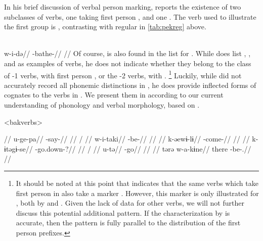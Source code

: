 In his brief discussion of \bakairi verbal person marking, \textcite{meira2003bakairi} reports the existence of two subclasses of  verbs, one taking first person , and one .
The verb used to illustrate the first group is   , contrasting with regular   in \cref{tab:pekreg} above.

\bakairi \parencite[][4]{meira2003bakairi}\\
\begingl
\gla w-i-də//
\glb {}-bathe-//
\glft {}//
\endgl
\xe
%
Of course,  is also found in the list for \arara.
While \textcite[4]{meira2003bakairi} does list  ,  , and   as examples of  verbs, he does not indicate whether they belong to the class of -1 verbs, with first person , or the -2 verbs, with .%
\footnote{
It should be noted at this point that \textcite{meira2003bakairi} indicates that the same verbs which take first person  in \bakairi also take a  marker .
However, this marker is only illustrated for , both by \textcite{meira2003bakairi} and \textcite{von1892bakairi}.
Given the lack of data for other verbs, we will not further discuss this potential additional pattern.
If the characterization by \citeauthor{meira2003bakairi} is accurate, then the pattern is fully parallel to the distribution of the first person prefixes.
}
Luckily, while \textcite{von1892bakairi} did not accurately record all phonemic distinctions in \bakairi \parencite{meira2005bakairi}, he does provide inflected forms of cognates to the \arara verbs in .
We present them in  according to our current understanding of \bakairi phonology and verbal morphology, based on \textcites{wheatley1969bakairi}{meira2003bakairi}{meira2005bakairi}{franchetto2016classes}.

\pex[everyglpreamble=]<bakverbs> \bakairi \parencite[][131, 397, 76, 137, 374, 130]{von1892bakairi}
\begin{multicols}{2}
\begingl
\glpreamble {} //
\gla u-ge-pa//
\glb {}-say-//
\glft {}//
\endgl
{}
\begingl
\glpreamble {} /  //
\gla w-i-taki//
\glb {}-be-//
\glft {}//
\endgl
{}
\begingl
\glpreamble {} //
\gla k-əewɨ-lɨ//
\glb {}-come-//
\glft {}//
\endgl
{}
\begingl
\glpreamble {} //
\gla k-ɨtəgɨ-se//
\glb {}-go.down-?//
\glft {}//
\endgl
{}
\begingl
\glpreamble {} / //
\gla u-tə//
\glb {}-go//
\glft {}//
\endgl
{}
\begingl
\glpreamble {}//
\gla tərə w-a-kɨne//
\glb there -be-.//
\glft {}//
\endgl
\end{multicols}
\xe

